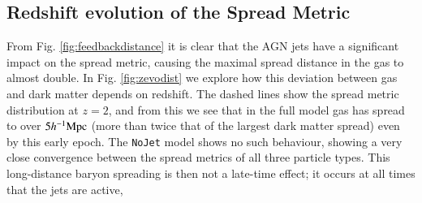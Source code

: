 \documentclass[fleqn,usenatbib]{mnras}
\newcommand{\hmpc}{h^{-1}{\rm Mpc}}
\newcommand{\nojet}{{\tt NoJet}}
\begin{document}
\subsection{Redshift evolution of the Spread Metric}


From Fig. \ref{fig:feedbackdistance} it is clear that the AGN jets have a
significant impact on the spread metric, causing the maximal spread distance
in the gas to almost double. In Fig. \ref{fig:zevodist} we explore how this
deviation between gas and dark matter depends on redshift. The dashed lines
show the spread metric distribution at $z=2$, and from this we see that in
the full model gas has spread to over $5\hmpc{}$ (more than twice that of the
largest dark matter spread) even by this early epoch. The \nojet{} model
shows no such behaviour, showing a very close convergence between the spread
metrics of all three particle types. This long-distance baryon spreading is
then not a late-time effect; it occurs at all times that the jets are active,
\end{document}

